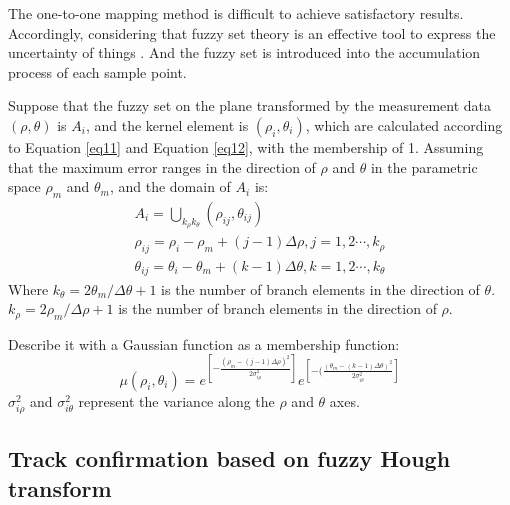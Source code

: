 \documentclass[default,iicol]{sn-jnl}%
\theoremstyle{thmstyleone}%
\theoremstyle{thmstyletwo}%
\theoremstyle{thmstylethree}%
\begin{document}
The one-to-one mapping method is difficult to achieve satisfactory results. Accordingly, considering that fuzzy set theory is an effective tool to express the uncertainty of things \cite{bib19}. And the fuzzy set is introduced into the accumulation process of each sample point.

Suppose that the fuzzy set on the plane transformed by the measurement data $( \rho , \theta )$ is $A _ { i }$, and the kernel element is $( \rho _ { i } , \theta _ { i } )$, which are calculated according to Equation \ref{eq11} and Equation \ref{eq12}, with the membership of 1. Assuming that the maximum error ranges in the direction of $\rho$ and $\theta$ in the parametric space $ \rho _ { m }$ and $\theta _ {m}$, and the domain of $A _ { i }$ is:
\begin{equation}
    \left. \begin{array}  { l  }  { A _ { i } = \bigcup_{k_{\rho } k_{\theta }} ( \rho _ { i j} , \theta _ { i j} ) } \\ { \rho _ { i j } = \rho _ { i } - \rho _ { m } + ( j - 1 ) \varDelta \rho,   j = 1 , 2 \cdots , k _ { \rho }} \\ { \theta _ { i j } = \theta _ { i } - \theta _ { m } + ( k-1)\varDelta \theta,   k = 1 , 2 \cdots , k _ { \theta }}\end{array} \right.
    \label{eq13}
\end{equation}
Where $k _ { \theta } = 2 \theta _ { m } / \varDelta  \theta + 1$ is the number of branch elements in the direction of $\theta$. $k _ { \rho } = 2 \rho _ { m } / \varDelta  \rho + 1$ is the number of branch elements in the direction of $\rho$.

Describe it with a Gaussian function as a membership function:
\begin{equation}
    \mu ( \rho _ { i  }, \theta _ { i } ) = e ^ { [ -  \frac { ( \rho _{m} - ( j - 1 ) \varDelta  \rho  ) ^ { 2 } } { 2 \sigma _ { i \rho }^ { 2 } }  ]}  e ^ { [ - (\frac { ( \theta _ { m } - ( k - 1 ) \varDelta \theta) ^ { 2 } } { 2 \sigma _ { i \theta }^ { 2 } }  ]}
    \label{eq14}
\end{equation}
$\sigma _ { i \rho }^ { 2 }$ and $\sigma _ { i \theta }^ { 2 } $ represent the variance along the $\rho$ and $\theta$ axes.


\subsection{Track confirmation based on fuzzy Hough transform}\label{subsec4}
\end{document}
